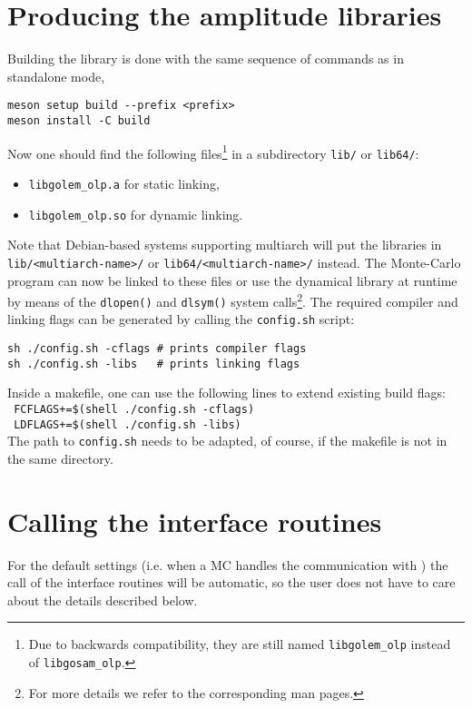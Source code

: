 %
%
%
%

\section{Producing the amplitude libraries}\label{sec:BLHA_compiling}
Building the library is done with the same sequence of commands as in standalone mode,
\begin{lstlisting}[style=sh]
meson setup build --prefix <prefix> 
meson install -C build
\end{lstlisting}
Now one should find the following files\footnote{Due to backwards compatibility, they are still named \texttt{libgolem\_olp} instead of \texttt{libgosam\_olp}.} in a subdirectory \texttt{lib/} or \texttt{lib64/}:
\begin{itemize}
\item \texttt{libgolem\_olp.a} for static linking,
\item \texttt{libgolem\_olp.so} for dynamic linking.
\end{itemize}
Note that Debian-based systems supporting multiarch will put the libraries in \texttt{lib/<multiarch-name>/} or \texttt{lib64/<multiarch-name>/} instead. The Monte-Carlo program can now be linked to these files or use the dynamical library at runtime by means of the \texttt{dlopen()} and \texttt{dlsym()} system calls\footnote{For more details we refer to the corresponding man pages.}. The required compiler and linking flags can be generated by calling the \texttt{config.sh} script:
\begin{lstlisting}[style=sh]
sh ./config.sh -cflags # prints compiler flags 
sh ./config.sh -libs   # prints linking flags
\end{lstlisting}
Inside a makefile, one can use the following lines to extend existing build flags:\\[5pt]
\texttt{ FCFLAGS+=\$(shell ./config.sh -cflags)} \\
\texttt{ LDFLAGS+=\$(shell ./config.sh -libs)}\\[5pt]
\noindent The path to \texttt{config.sh} needs to be adapted, of course, if the makefile is not in the same directory.

%
%
%
%

\section{Calling the interface routines}\label{sec:BLHA_calling}
For the default settings (i.e. when a MC handles the communication with \gosam) the call of the interface routines will be automatic, so the user does not have to care about the details described below.

